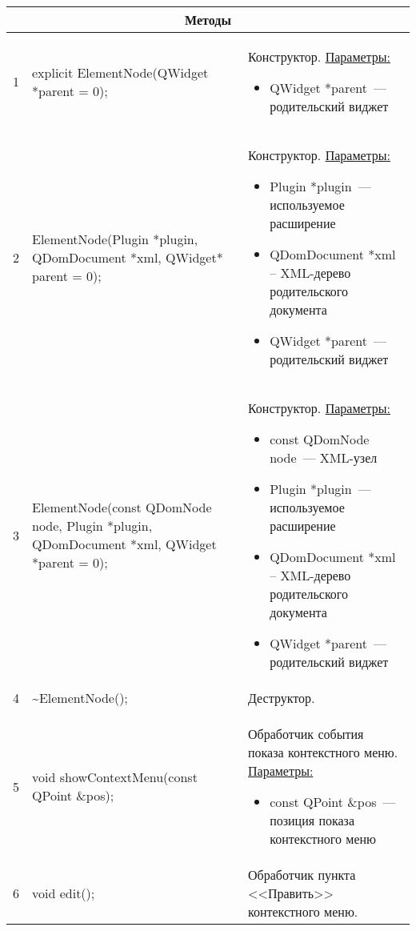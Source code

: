 \begin{longtable}[h]{|p{}|p{}|p{}|}
  \multicolumn{3}{|c|}{\textbf{Методы}} \\
  \hline
  1 & explicit ElementNode(QWidget *parent = 0); &
    Конструктор.\newline
    \uline{Параметры:}
    \begin{itemize}[nolistsep,label=,leftmargin=0cm]
      \item QWidget *parent~--- родительский виджет
    \end{itemize}\\ \hline
  2 & ElementNode(Plugin *plugin, QDomDocument *xml, QWidget* parent = 0); &
    Конструктор.\newline
    \uline{Параметры:}
    \begin{itemize}[nolistsep,label=,leftmargin=0cm]
      \item Plugin *plugin~--- используемое расширение
      \item QDomDocument *xml -- XML-дерево родительского документа
      \item QWidget *parent~--- родительский виджет
    \end{itemize}\\ \hline
  3 & ElementNode(const QDomNode node, Plugin *plugin, QDomDocument *xml, QWidget *parent = 0); &
    Конструктор.\newline
    \uline{Параметры:}
    \begin{itemize}[nolistsep,label=,leftmargin=0cm]
      \item const QDomNode node~--- XML-узел
      \item Plugin *plugin~--- используемое расширение
      \item QDomDocument *xml -- XML-дерево родительского документа
      \item QWidget *parent~--- родительский виджет
    \end{itemize}\\ \hline
  4 & \textasciitilde ElementNode(); & Деструктор. \\ \hline
  5 & void showContextMenu(const QPoint \&pos); & Обработчик события показа контекстного меню.\newline
    \uline{Параметры:}
    \begin{itemize}[nolistsep,label=,leftmargin=0cm]
      \item const QPoint \&pos~--- позиция показа контекстного меню
    \end{itemize}\\ \hline
  6 & void edit(); & Обработчик пункта <<Править>> контекстного меню.\\ \hline

\end{longtable}
